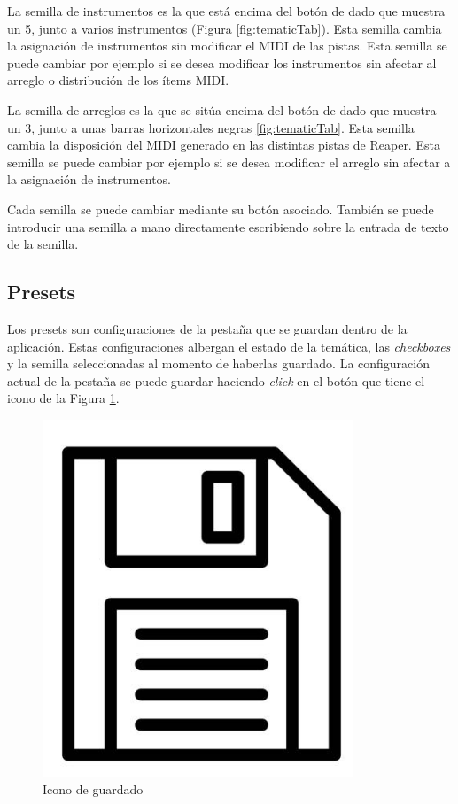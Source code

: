 La semilla de instrumentos es la que está encima del botón de dado que muestra un 5, junto a varios instrumentos (Figura \ref{fig:tematicTab}). Esta semilla cambia la asignación de instrumentos sin modificar el MIDI de las pistas. Esta semilla se puede cambiar por ejemplo si se desea modificar los instrumentos sin afectar al arreglo o distribución de los ítems MIDI.

La semilla de arreglos es la que se sitúa encima del botón de dado que muestra un 3, junto a unas barras horizontales negras \ref{fig:tematicTab}. Esta semilla cambia la disposición del MIDI generado en las distintas pistas de Reaper. Esta semilla se puede cambiar por ejemplo si se desea modificar el arreglo sin afectar a la asignación de instrumentos.

Cada semilla se puede cambiar mediante su botón asociado. También se puede introducir una semilla a mano directamente escribiendo sobre la entrada de texto de la semilla.


\subsection{Presets}
\label{subsec:app:presets}
Los presets son configuraciones de la pestaña \tematicTabName{} que se guardan dentro de la aplicación. Estas configuraciones albergan el estado de la temática, las \textit{checkboxes} y la semilla seleccionadas al momento de haberlas guardado. La configuración actual de la pestaña \tematicTabName{} se puede guardar haciendo \textit{click} en el botón que tiene el icono de la Figura \ref{fig:savePresetIcon}.

\begin{figure}[h]
    \begin{center}
        \includegraphics[scale=0.25]{Imagenes/Bitmap/saveIcon.png}
    \end{center}
    \caption{Icono de guardado}
    \label{fig:savePresetIcon}
\end{figure}


